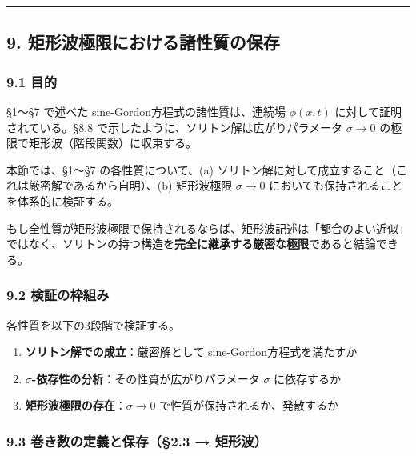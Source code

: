 \documentclass[a4paper,11pt]{ltjsarticle}
\providecommand{\tightlist}{\setlength{\itemsep}{0pt}\setlength{\parskip}{0pt}}
\begin{document}
\begin{center}\rule{0.5\linewidth}{0.5pt}\end{center}

\subsection{9.
矩形波極限における諸性質の保存}\label{ux77e9ux5f62ux6ce2ux6975ux9650ux306bux304aux3051ux308bux8af8ux6027ux8ceaux306eux4fddux5b58}

\subsubsection{9.1 目的}\label{ux76eeux7684}

§1〜§7 で述べた sine-Gordon方程式の諸性質は、連続場 \(\phi(x, t)\)
に対して証明されている。§8.8
で示したように、ソリトン解は広がりパラメータ \(\sigma \to 0\)
の極限で矩形波（階段関数）に収束する。

本節では、§1〜§7 の各性質について、(a)
ソリトン解に対して成立すること（これは厳密解であるから自明）、(b)
矩形波極限 \(\sigma \to 0\) においても保持されることを体系的に検証する。

もし全性質が矩形波極限で保持されるならば、矩形波記述は「都合のよい近似」ではなく、ソリトンの持つ構造を\textbf{完全に継承する厳密な極限}であると結論できる。

\subsubsection{9.2
検証の枠組み}\label{ux691cux8a3cux306eux67a0ux7d44ux307f}

各性質を以下の3段階で検証する。

\begin{enumerate}
\def\labelenumi{\arabic{enumi}.}
\tightlist
\item
  \textbf{ソリトン解での成立}：厳密解として sine-Gordon方程式を満たすか
\item
  \textbf{\(\sigma\)-依存性の分析}：その性質が広がりパラメータ
  \(\sigma\) に依存するか
\item
  \textbf{矩形波極限の存在}：\(\sigma \to 0\)
  で性質が保持されるか、発散するか
\end{enumerate}

\subsubsection{9.3 巻き数の定義と保存（§2.3 →
矩形波）}\label{ux5dfbux304dux6570ux306eux5b9aux7fa9ux3068ux4fddux5b582.3-ux77e9ux5f62ux6ce2}
\end{document}

